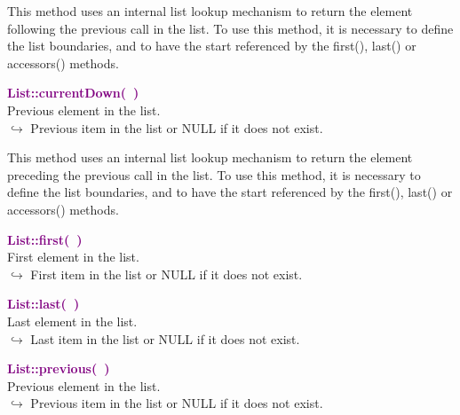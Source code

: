 This method uses an internal list lookup mechanism to return the element following the previous call in the list.
To use this method, it is necessary to define the list boundaries, and to have the start referenced by the first(), last() or accessors() methods.

\textcolor{purple}{\textbf{List::currentDown(~)}}\label{List::currentDown()}\\
Previous element in the list.\\ \hspace*{10mm}$\hookrightarrow$ Previous item in the list or NULL if it does not exist.

This method uses an internal list lookup mechanism to return the element preceding the previous call in the list.
To use this method, it is necessary to define the list boundaries, and to have the start referenced by the first(), last() or accessors() methods.

\textcolor{purple}{\textbf{List::first(~)}}\label{List::first()}\\
First element in the list.\\ \hspace*{10mm}$\hookrightarrow$ First item in the list or NULL if it does not exist.


\textcolor{purple}{\textbf{List::last(~)}}\label{List::last()}\\
Last element in the list.\\ \hspace*{10mm}$\hookrightarrow$ Last item in the list or NULL if it does not exist.


\textcolor{purple}{\textbf{List::previous(~)}}\label{List::previous()}\\
Previous element in the list.\\ \hspace*{10mm}$\hookrightarrow$ Previous item in the list or NULL if it does not exist.

